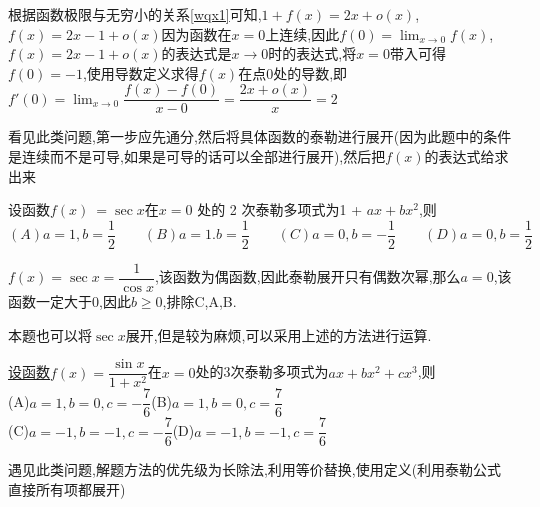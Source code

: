 \documentclass[8pt a4paper, oneside, UTF8]{ctexbook}
\begin{document}
\begin{sloppypar}
\begin{solution}
        根据函数极限与无穷小的关系\ref{wqx1}可知,$1+f(x)=2x+o(x)$,$f(x)=2x-1+o(x)$因为函数在$x=0$上连续,因此$f(0)=\lim_{x\to 0}f(x)$,$f(x)=2x-1+o(x)$的表达式是$x\to 0$时的表达式,将$x=0$带入可得$f(0)=-1$,使用导数定义求得$f(x)$在点0处的导数,即$f'(0)=\lim_{x \to 0}\dfrac{f(x)-f(0)}{x-0}=\dfrac{2x+o(x)}{x}=2$
    \end{solution}
    \begin{note}
        看见此类问题,第一步应先通分,然后将具体函数的泰勒进行展开(因为此题中的条件是连续而不是可导,如果是可导的话可以全部进行展开),然后把$f(x)$的表达式给求出来
    \end{note}
    \begin{problem}
    设函数$f(x)\:=\sec x$在$x=0$ 处的 2 次泰勒多项式为1 + $ax+bx^2$,则\\
    $(A)a=1,b=\dfrac{1}{2}  \qquad (B)a=1.b=\dfrac{1}{2}  \qquad (C)a=0,b=-\dfrac{1}{2} \qquad  (D)a=0,b=\dfrac{1}{2}$
    \end{problem}
    \begin{solution}
        $f(x)=\sec x=\dfrac{1}{\cos x}$,该函数为偶函数,因此泰勒展开只有偶数次幂,那么$a=0$,该函数一定大于0,因此$b \geq 0$,排除C,A,B.
    \end{solution}
    \begin{note}
        本题也可以将$\sec x$展开,但是较为麻烦,可以采用上述的方法进行运算.
    \end{note}
    \begin{problem}
    \uline{设函数}$f(x)=\dfrac{\sin x}{1+x^2}$在$x=0$处的3次泰勒多项式为$ax + b x ^ 2 + c x ^ 3 $,则
    \\(A)$a=1,b=0,c=-\dfrac{7}{6}$\quad (B)$a=1,b=0,c=\dfrac{7}{6}$\\ (C)$a=-1,b=-1,c=-\dfrac{7}{6}$\quad (D)$a=-1,b=-1,c=\dfrac{7}{6}$
    \end{problem}
    \begin{note}
        遇见此类问题,解题方法的优先级为长除法,利用等价替换,使用定义(利用泰勒公式直接所有项都展开)
    \end{note}

\end{sloppypar}
\end{document}
